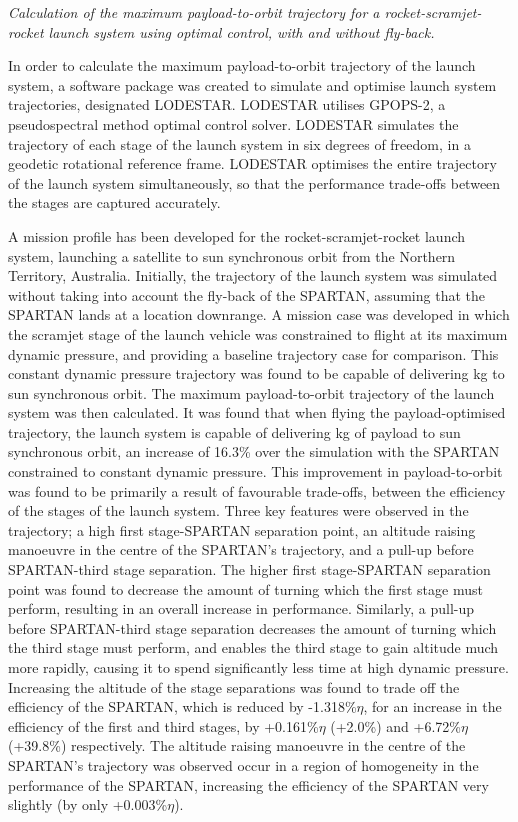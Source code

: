	
\emph{Calculation of the maximum payload-to-orbit trajectory for a rocket-scramjet-rocket launch system using optimal control, with and without fly-back.}

In order to calculate the maximum payload-to-orbit trajectory of the launch system, a software package was created to simulate and optimise launch system trajectories, designated LODESTAR. LODESTAR utilises GPOPS-2, a pseudospectral method optimal control solver. LODESTAR simulates the trajectory of each stage of the launch system in six degrees of freedom, in a geodetic rotational reference frame. 
LODESTAR optimises the entire trajectory of the launch system simultaneously, so that the performance trade-offs between the stages are captured accurately.

A mission profile has been developed for the rocket-scramjet-rocket launch system, launching a satellite to sun synchronous orbit from the Northern Territory, Australia. 
Initially, the trajectory of the launch system was simulated without taking into account the fly-back of the SPARTAN, assuming that the SPARTAN lands at a location downrange.
A mission case was developed in which the scramjet stage of the launch vehicle was constrained to flight at its maximum dynamic pressure, and providing a baseline trajectory case for comparison. This constant dynamic pressure trajectory was found to be capable of delivering \PayloadToOrbitConstq kg to sun synchronous orbit. 
The maximum payload-to-orbit trajectory of the launch system was then calculated. It was found that when flying the payload-optimised trajectory, the launch system is capable of delivering \PayloadToOrbitStandardNoReturn kg of payload to sun synchronous orbit, an increase of 16.3\% over the simulation with the SPARTAN constrained to constant dynamic pressure. 
This improvement in payload-to-orbit was found to be primarily a result of favourable trade-offs, between the efficiency of the stages of the launch system.
Three key features were observed in the trajectory; a high first stage-SPARTAN separation point, an altitude raising manoeuvre in the centre of the SPARTAN's trajectory, and a pull-up before SPARTAN-third stage separation. 
The higher first stage-SPARTAN separation point was found to decrease the amount of turning which the first stage must perform, resulting in an overall increase in performance. Similarly, a pull-up before SPARTAN-third stage separation decreases the amount of turning which the third stage must perform, and enables the third stage to gain altitude much more rapidly, causing it to spend significantly less time at high dynamic pressure. 
 Increasing the altitude of the stage separations was found to trade off the efficiency of the SPARTAN, which is reduced by -1.318\%$\eta$, for an increase in the efficiency of the first and third stages, by +0.161\%$\eta$ (+2.0\%) and +6.72\%$\eta$ (+39.8\%) respectively.
The altitude raising manoeuvre in the centre of the SPARTAN's trajectory was observed occur in a region of homogeneity in the performance of the SPARTAN, increasing the efficiency of the SPARTAN very slightly (by only +0.003\%$\eta$).


